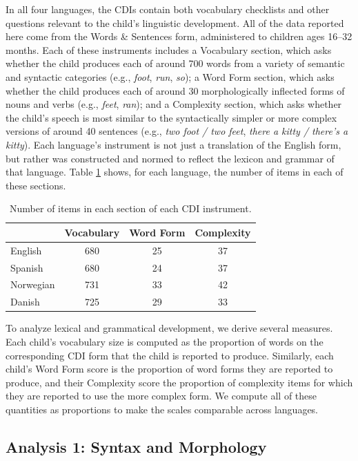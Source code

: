 \documentclass[10pt,letterpaper]{article}
\begin{document}
In all four languages, the CDIs contain both vocabulary checklists and other questions relevant to the child's linguistic development. All of the data reported here come from the Words \& Sentences form, administered to children ages 16--32 months. Each of these instruments includes a Vocabulary section, which asks whether the child produces each of around 700 words from a variety of semantic and syntactic categories (e.g., \emph{foot}, \emph{run}, \emph{so}); a Word Form section, which asks whether the child produces each of around 30 morphologically inflected forms of nouns and verbs (e.g., \emph{feet}, \emph{ran}); and a Complexity section, which asks whether the child's speech is most similar to the syntactically simpler or more complex versions of around 40 sentences (e.g., \emph{two foot / two feet}, \emph{there a kitty / there's a kitty}). Each language's instrument is not just a translation of the English form, but rather was constructed and normed to reflect the lexicon and grammar of that language. Table \ref{table:measures} shows, for each language, the number of items in each of these sections.

\begin{table}
\begin{center}
\begin{tabular}{lccc}
\hline
& Vocabulary & Word Form & Complexity\\ 
\hline
English & 680 & 25 & 37\\ 
Spanish & 680 & 24 & 37\\ 
Norwegian & 731 & 33 & 42\\ 
Danish & 725 & 29 & 33\\ 
\hline
\end{tabular}
\end{center}
\caption{\label{table:measures} Number of items in each section of each CDI instrument.}
\end{table}

To analyze lexical and grammatical development, we derive several measures. Each child's vocabulary size is computed as the proportion of words on the corresponding CDI form that the child is reported to produce. Similarly, each child's Word Form score is the proportion of word forms they are reported to produce, and their Complexity score the proportion of complexity items for which they are reported to use the more complex form. We compute all of these quantities as proportions to make the scales comparable across languages.

\subsection{Analysis 1: Syntax and Morphology}
\end{document}
